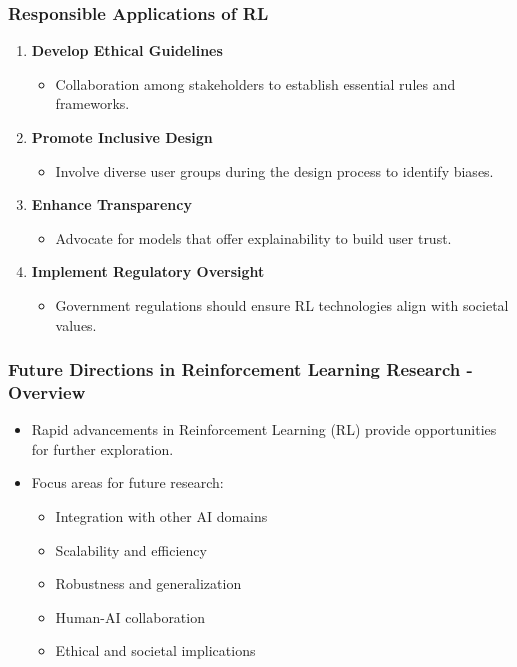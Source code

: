 \documentclass[aspectratio=169]{beamer}
\begin{document}
\begin{frame}
    \frametitle{Responsible Applications of RL}
    \begin{enumerate}
        \item \textbf{Develop Ethical Guidelines}
            \begin{itemize}
                \item Collaboration among stakeholders to establish essential rules and frameworks.
            \end{itemize}
        
        \item \textbf{Promote Inclusive Design}
            \begin{itemize}
                \item Involve diverse user groups during the design process to identify biases.
            \end{itemize}
        
        \item \textbf{Enhance Transparency}
            \begin{itemize}
                \item Advocate for models that offer explainability to build user trust.
            \end{itemize}
        
        \item \textbf{Implement Regulatory Oversight}
            \begin{itemize}
                \item Government regulations should ensure RL technologies align with societal values.
            \end{itemize}
    \end{enumerate}
\end{frame}

\begin{frame}[fragile]
    \frametitle{Future Directions in Reinforcement Learning Research - Overview}
    \begin{itemize}
        \item Rapid advancements in Reinforcement Learning (RL) provide opportunities for further exploration.
        \item Focus areas for future research:
        \begin{itemize}
            \item Integration with other AI domains
            \item Scalability and efficiency
            \item Robustness and generalization
            \item Human-AI collaboration
            \item Ethical and societal implications
        \end{itemize}
    \end{itemize}
\end{frame}
\end{document}

